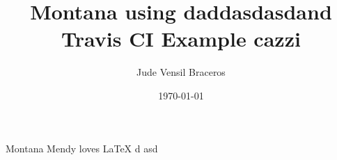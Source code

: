 \documentclass{article}
\title{Montana using  daddasdasdand Travis CI Example cazzi}
\author{Jude Vensil Braceros}
\date{\today}
\begin{document}
\maketitle

Montana Mendy loves LaTeX d asd
\end{document}
